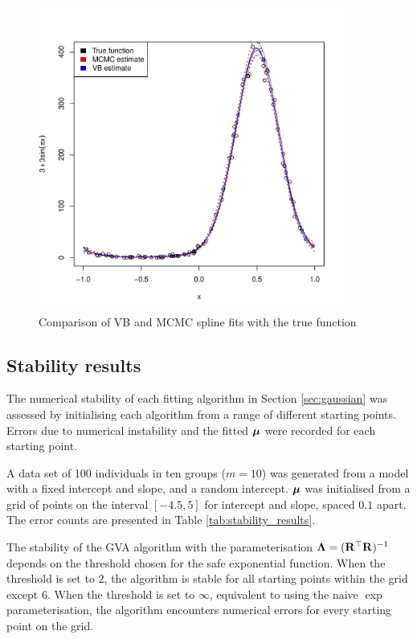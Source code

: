 \documentclass{amsart}[12pt]
\begin{document}
	\begin{figure}
		\label{fig:spline}
		\caption{Comparison of VB and MCMC spline fits with the true function}
		\includegraphics[width=100mm, height=100mm]{code/results/accuracy_plots_spline_gva2.pdf}
	\end{figure}
		
		
	\subsection{Stability results}
		
	The numerical stability of each fitting algorithm in Section \ref{sec:gaussian} was assessed by initialising
	each algorithm from a range of different starting points. Errors due to numerical instability and the fitted
	${\boldsymbol \mu}$ were recorded for each starting point.
		
	A data set of 100 individuals in ten groups ($m=10$) was generated from a model with a fixed intercept and
	slope, and a random intercept. ${\boldsymbol \mu}$ was initialised from a grid of points on the interval $[-4.5, 5]$ for
	intercept and slope, spaced $0.1$ apart. The error counts are presented in Table
	\ref{tab:stability_results}.

	The stability of the GVA algorithm with the parameterisation ${\boldsymbol \Lambda} = ({\bf R}^\top {\bf R})^{-1}$ depends on the
	threshold chosen for the safe exponential function. When the threshold is set to $2$, the algorithm is stable
	for all starting points within the grid except $6$. When the threshold is set to $\infty$, equivalent to using
	the naive $\exp$ parameterisation, the algorithm encounters numerical errors for every starting point on the 
	grid.
		
\end{document}

